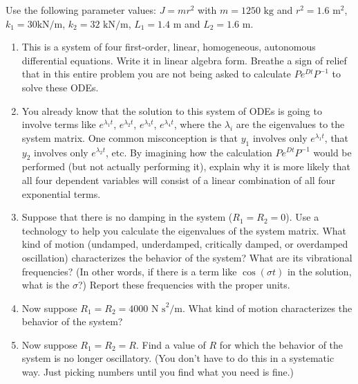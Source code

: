 \documentclass[12pt,letterpaper]{hmcpset}
\newcommand{\ind}{\leavevmode{\parindent=1em\indent}}
\begin{document}
\begin{problem}[5]
    \ind Use the following parameter values: $J=mr^2$ with
    $m=1250\text{ kg}$ and $r^2=1.6\text{ m}^2$, $k_1=30\text{
    kN}/\text{m}$, $k_2=32\text{ kN}/\text{m}$, $L_1=1.4\text{ m}$
    and $L_2=1.6\text{ m}$.
    \begin{enumerate}
        \item This is a system of four first-order, linear,
            homogeneous, autonomous differential equations. Write it in
            linear algebra form. Breathe a sign of relief that in this
            entire problem you are not being asked to calculate
            $Pe^{Dt}P^{-1}$ to solve these ODEs.
        \item You already know that the solution to this system of
            ODEs is going to involve terms like $e^{\lambda_1 t}$,
            $e^{\lambda_2 t}$, $e^{\lambda_3 t}$, $e^{\lambda_4 t}$,
            where the $\lambda_i$ are the eigenvalues to the system
            matrix. One common misconception is that $y_1$ involves only
            $e^{\lambda_1 t}$, that $y_2$ involves only $e^{\lambda_2
            t}$, etc.  By imagining how the calculation
            $Pe^{Dt}P^{-1}$ would be performed (but not actually
            performing it), explain why it is more likely that all four
            dependent variables will consist of a linear combination of
            all four exponential terms.
    \end{enumerate}
\end{problem}
\begin{problem}[5 cont.]
    \begin{enumerate}
        \setcounter{enumi}{2}
        \item Suppose that there is no damping in the system
            ($R_1=R_2=0$). Use a technology to help you calculate the
            eigenvalues of the system matrix.  What kind of motion
            (undamped, underdamped, critically damped, or overdamped
            oscillation) characterizes the behavior of the system?  What
            are its vibrational frequencies?  (In other words, if there
            is a term like $\cos(\sigma t)$ in the solution, what is the
            $\sigma$?)  Report these frequencies with the proper units.
        \item Now suppose $R_1=R_2=4000\text{ N s}^2/\text{m}$. What
            kind of motion characterizes the behavior of the system?
        \item Now suppose $R_1=R_2=R$. Find a value of $R$ for which
            the behavior of the system is no longer oscillatory. (You
            don't have to do this in a systematic way. Just picking
            numbers until you find what you need is fine.)
    \end{enumerate}
\end{problem}
\begin{solution}
    \vfill
\end{solution}
\end{document}
